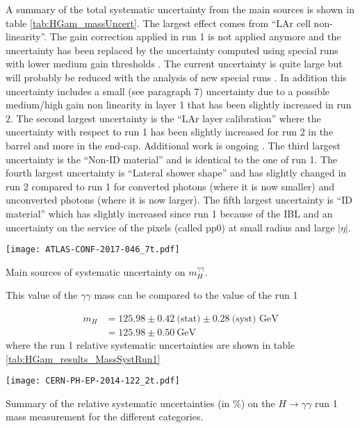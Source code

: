 A summary of the total systematic uncertainty from the main sources is shown in table \ref{tab:HGam_massUncert}.
The largest effect comes from ``LAr cell non-linearity''.
The gain correction applied in run 1 is not applied anymore \cite{ATL-COM-PHYS-2017-758} and the uncertainty has been replaced by the uncertainty computed using special runs with lower medium gain thresholds \cite{Unal_20170427}.
The current uncertainty is quite large but will probably be reduced with the analysis of new special runs \cite{Unal_20170622}.
In addition this uncertainty includes a small (see \cite{ATL-COM-PHYS-2013-1423} paragraph 7) uncertainty due to a possible medium/high gain non linearity in layer 1 that has been slightly increased in run 2.
The second largest uncertainty is the ``LAr layer calibration'' \cite{ATL-COM-PHYS-2013-1423} where the uncertainty with respect to run 1 has been slightly increased for run 2 in the barrel and more in the end-cap.
Additional work is ongoing \cite{ATL-COM-PHYS-2017-760}.
The third largest uncertainty is the ``Non-ID material'' and is identical to the one of run 1.
The fourth largest uncertainty is ``Lateral shower shape'' and has slightly changed in run 2 compared to run 1 \cite{CERN-PH-EP-2014-153,ATL-COM-PHYS-2017-758} for converted photons (where it is now smaller) and unconverted photons (where it is now larger).
The fifth largest uncertainty is ``ID material'' which has slightly increased since run 1 \cite{ATL-COM-PHYS-2017-759} because of the IBL and an uncertainty on the service of the pixels (called pp0) at small radius and large $|\eta|$.
\begin{table}
  \centering
  \texttt{[image: ATLAS-CONF-2017-046\_7t.pdf]}
  \caption{Main sources of systematic uncertainty on $m_H^{\gamma\gamma}$. \cite{ATLAS-CONF-2017-046}}
  \label{tab:HGam_massUncert}
\end{table}



This value of the $\gamma\gamma$ mass can be compared to the value of the run 1 \cite{CERN-PH-EP-2014-122}

\begin{align*}
  m_H &= 125.98 \pm 0.42\ \text{(stat)} \pm 0.28 \ \text{(syst) GeV}\\
  &= 125.98 \pm  0.50 \ \text{GeV}
\end{align*}
where the run 1 relative systematic uncertainties are shown in table \ref{tab:HGam_results_MassSystRun1}

\begin{table}
  \centering
  \texttt{[image: CERN-PH-EP-2014-122\_2t.pdf]}
  \caption{Summary of the relative systematic uncertainties (in $\%$) on the $H\rightarrow\gamma\gamma$ run 1 mass measurement for the different categories. \cite{CERN-PH-EP-2014-122} }
  \label{tab:HGam_results_MassSystRun1}
\end{table}


